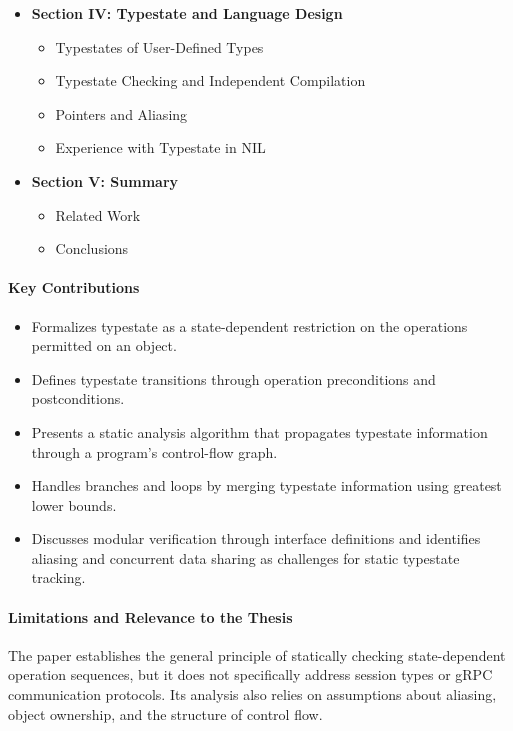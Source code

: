 \begin{itemize}
    \item \textbf{Section IV: Typestate and Language Design}
    \begin{itemize}
        \item Typestates of User-Defined Types
        \item Typestate Checking and Independent Compilation
        \item Pointers and Aliasing
        \item Experience with Typestate in NIL
    \end{itemize}

    \item \textbf{Section V: Summary}
    \begin{itemize}
        \item Related Work
        \item Conclusions
    \end{itemize}
\end{itemize}

\paragraph{Key Contributions}
\begin{itemize}
    \item Formalizes typestate as a state-dependent restriction on the
    operations permitted on an object.
    \item Defines typestate transitions through operation preconditions
    and postconditions.
    \item Presents a static analysis algorithm that propagates typestate
    information through a program's control-flow graph.
    \item Handles branches and loops by merging typestate information
    using greatest lower bounds.
    \item Discusses modular verification through interface definitions
    and identifies aliasing and concurrent data sharing as challenges
    for static typestate tracking.
\end{itemize}

\paragraph{Limitations and Relevance to the Thesis}
The paper establishes the general principle of statically checking
state-dependent operation sequences, but it does not specifically address
session types or gRPC communication protocols. Its analysis also relies
on assumptions about aliasing, object ownership, and the structure of
control flow.

